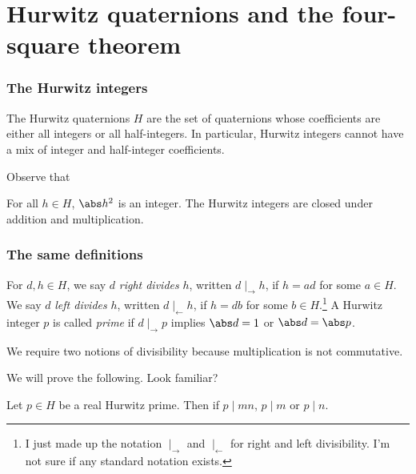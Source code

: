 \documentclass{beamer}
\newcommand{\rdiv}{\mid_\rightarrow}
\newcommand{\ldiv}{\mid_\leftarrow}
\begin{document}
\section{Hurwitz quaternions and the four-square theorem}

\begin{frame}
	\frametitle{The Hurwitz integers}
	\begin{definition}
		The Hurwitz quaternions $H$ are the set of quaternions whose coefficients are either all integers or all half-integers. In particular, Hurwitz integers cannot have a mix of integer and half-integer coefficients.
	\end{definition}
	
	Observe that
	\begin{itemize}
		\ii For all $h \in H$, $\abs h^2$ is an integer.
		\ii The Hurwitz integers are closed under addition and multiplication.
	\end{itemize}
\end{frame}

\begin{frame}
	\frametitle{The same definitions}
	\begin{itemize}
		\ii For $d,h \in H$, we say $d$ \emph{right divides} $h$, written $d \rdiv h$, if $h = ad$ for some $a \in H$. We say $d$ \emph{left divides} $h$, written $d \ldiv h$, if $h = db$ for some $b \in H$.\footnote{I just made up the notation $\rdiv$ and $\ldiv$ for right and left divisibility. I'm not sure if any standard notation exists.}
		\ii A Hurwitz integer $p$ is called \emph{prime} if $d \rdiv p$ implies $\abs d = 1$ or $\abs d = \abs p$.
	\end{itemize}

	We require two notions of divisibility because multiplication is not commutative.

	We will prove the following. Look familiar?

	\begin{lemma}
		Let $p \in H$ be a real Hurwitz prime. Then if $p \mid mn$, $p \mid m$ or $p \mid n$.
	\end{lemma}
\end{frame}
\end{document}

